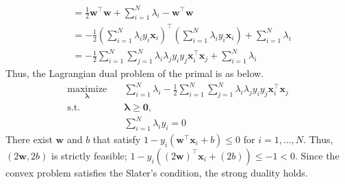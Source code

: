 \documentclass[11pt]{article}
\begin{document}
\begin{enumerate}
\begin{align*}
    &= \frac{1}{2}\bm w^{\top}\bm w+\sum_{i=1}^{N}\lambda_{i}-\bm w^{\top}\bm w \\
    &= -\frac{1}{2}\left(\sum_{i=1}^{N}\lambda_{i}y_{i}\bm x_{i}\right)^{\!\top}\!\left(\sum_{i=1}^{N}\lambda_{i}y_{i}\bm x_{i}\right)
    +\sum_{i=1}^{N}\lambda_{i} \\
    &= -\frac{1}{2}\sum_{i=1}^{N}\sum_{j=1}^{N}\lambda_{i}\lambda_{j}y_{i}y_{j}\bm x_{i}^{\top}\bm x_{j}+\sum_{i=1}^{N}\lambda_{i}
    \end{align*}
    Thus, the Lagrangian dual problem of the primal is as below.
    \begin{align*}
    \underset{\bm\lambda}{\operatorname{maximize}}\quad & \sum_{i=1}^{N}\lambda_{i}-\frac{1}{2}\sum_{i=1}^{N}\sum_{j=1}^{N}\lambda_{i}\lambda_{j}y_{i}y_{j}\bm x_{i}^{\top}\bm x_{j} \\
    \text{s.t.}\quad & \bm\lambda \ge \bm 0, \\
    & \sum_{i=1}^{N}\lambda_{i}y_{i}=0
    \end{align*}
    There exist $\bm w$ and $b$ that satisfy $1-y_{i}(\bm w^{\top}\bm x_{i}+b)\le 0$ for $i=1,\dots,N$. Thus, $(2\bm w, 2b)$ is strictly feasible; $1-y_{i}((2\bm w)^{\top}\bm x_{i}+(2b))\le -1<0$. Since the convex problem satisfies the Slater's condition, the strong duality holds.
\end{enumerate}
\end{document}
